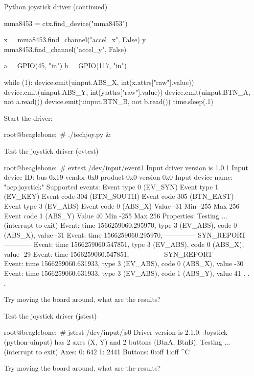 \begin{frame}
	{Python joystick driver (continued)}
	\begin{raw}
    mma8453 = ctx.find_device("mma8453")

    x = mma8453.find_channel("accel_x", False)
    y = mma8453.find_channel("accel_y", False)

    a = GPIO(45, "in")
    b = GPIO(117, "in")

    while (1):
        device.emit(uinput.ABS_X, int(x.attrs["raw"].value))
        device.emit(uinput.ABS_Y, int(y.attrs["raw"].value))
        device.emit(uinput.BTN_A, not a.read())
        device.emit(uinput.BTN_B, not b.read())
        time.sleep(.1)
	\end{raw}
	Start the driver:
	\begin{raw}
root@beaglebone:~# ./techjoy.py &
	\end{raw}

\end{frame}

\begin{frame}
{Test the joystick driver (evtest)}
	\begin{rawscriptsize}
root@beaglebone:~# evtest /dev/input/event1
Input driver version is 1.0.1
Input device ID: bus 0x19 vendor 0x0 product 0x0 version 0x0
Input device name: "ocp:joystick"
Supported events:
  Event type 0 (EV_SYN)
  Event type 1 (EV_KEY)
    Event code 304 (BTN_SOUTH)
    Event code 305 (BTN_EAST)
  Event type 3 (EV_ABS)
    Event code 0 (ABS_X)
      Value    -31
      Min     -255
      Max      256
    Event code 1 (ABS_Y)
      Value     40
      Min     -255
      Max      256
Properties:
Testing ... (interrupt to exit)
Event: time 1566259060.295970, type 3 (EV_ABS), code 0 (ABS_X), value -31
Event: time 1566259060.295970, -------------- SYN_REPORT ------------
Event: time 1566259060.547851, type 3 (EV_ABS), code 0 (ABS_X), value -29
Event: time 1566259060.547851, -------------- SYN_REPORT ------------
Event: time 1566259060.631933, type 3 (EV_ABS), code 0 (ABS_X), value -30
Event: time 1566259060.631933, type 3 (EV_ABS), code 1 (ABS_Y), value 41
.
.
.
	\end{rawscriptsize}

	Try moving the board around, what are the results?
\end{frame}

\begin{frame}
{Test the joystick driver (jstest)}

	\begin{rawscriptsize}
root@beaglebone:~# jstest /dev/input/js0 
Driver version is 2.1.0.
Joystick (python-uinput) has 2 axes (X, Y)
and 2 buttons (BtnA, BtnB).
Testing ... (interrupt to exit)
Axes:  0:   642  1:  2441 Buttons:  0:off  1:off ^C
	\end{rawscriptsize}

	Try moving the board around, what are the results?
\end{frame}

